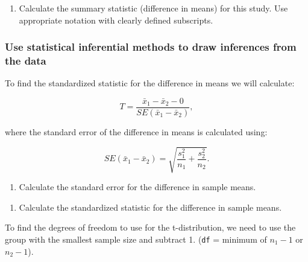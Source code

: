 \documentclass[
]{report}
\providecommand{\tightlist}{%
  \setlength{\itemsep}{0pt}\setlength{\parskip}{0pt}}
\begin{document}
\vspace{1.2in}

\begin{enumerate}
\def\labelenumi{\arabic{enumi}.}
\setcounter{enumi}{4}
\tightlist
\item
  Calculate the summary statistic (difference in means) for this study. Use appropriate notation with clearly defined subscripts.
\end{enumerate}

\vspace{1in}

\subsubsection*{Use statistical inferential methods to draw inferences from the data}\label{use-statistical-inferential-methods-to-draw-inferences-from-the-data-1}

To find the standardized statistic for the difference in means we will calculate:

\[T = \frac{\bar{x}_1-\bar{x}_2 -0}{SE(\bar{x}_1-\bar{x}_2)},\]

where the standard error of the difference in means is calculated using:

\[SE(\bar{x}_1 -\bar{x}_2)=\sqrt{\frac{s_1^2}{n_1}+\frac{s_2^2}{n_2}}.\]

\begin{enumerate}
\def\labelenumi{\arabic{enumi}.}
\setcounter{enumi}{5}
\tightlist
\item
  Calculate the standard error for the difference in sample means.
\end{enumerate}

\vspace{0.5in}

\begin{enumerate}
\def\labelenumi{\arabic{enumi}.}
\setcounter{enumi}{6}
\tightlist
\item
  Calculate the standardized statistic for the difference in sample means.
\end{enumerate}

\vspace{0.5in}

To find the degrees of freedom to use for the t-distribution, we need to use the group with the smallest sample size and subtract 1. (\texttt{df} = minimum of \(n_1 - 1\) or \(n_2 - 1\)).
\end{document}
